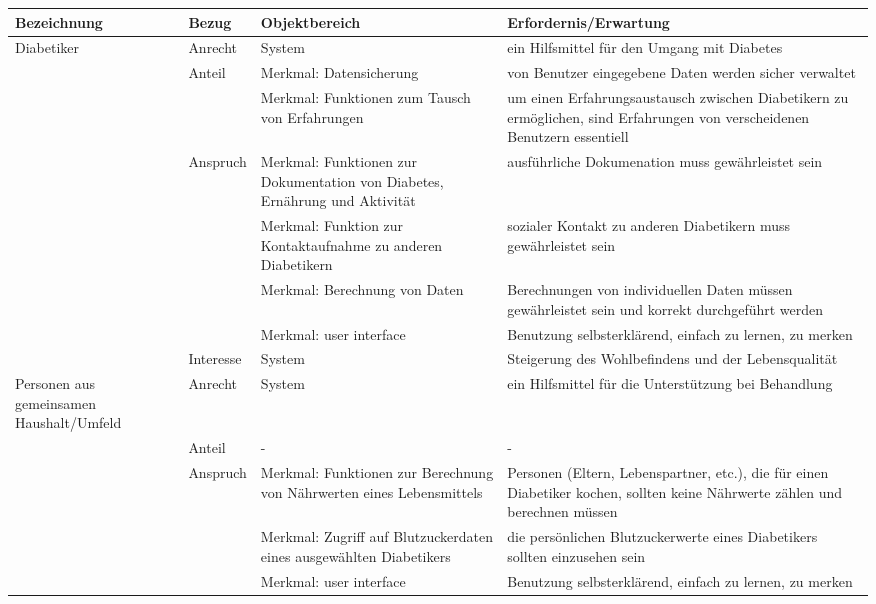 	\begin{center}
		\begin{longtable}[H]{|p{3cm}|p{2cm}|p{4cm}|p{4.5cm}|}
			\hline
			\textbf{Bezeichnung} & \textbf{Bezug} & \textbf{Objektbereich} & \textbf{Erfordernis/Erwartung}\\
			\hline
			Diabetiker & Anrecht & System & ein Hilfsmittel für den Umgang mit Diabetes\\
			\cline{2-4}
			& Anteil & Merkmal: Datensicherung & von Benutzer eingegebene Daten werden sicher verwaltet\\
			\cline{3-4}
			& & Merkmal: Funktionen zum Tausch von Erfahrungen & um einen Erfahrungsaustausch zwischen Diabetikern zu ermöglichen, sind Erfahrungen von verscheidenen Benutzern essentiell\\
			\cline{2-4}
			& Anspruch & Merkmal: Funktionen zur Dokumentation von Diabetes, Ernährung und Aktivität & ausführliche Dokumenation muss gewährleistet sein\\
			\cline{3-4}
			& & Merkmal: Funktion zur Kontaktaufnahme zu anderen Diabetikern & sozialer Kontakt zu anderen Diabetikern muss gewährleistet sein\\
			\cline{3-4}
			& & Merkmal: Berechnung von Daten & Berechnungen von individuellen Daten müssen gewährleistet sein und korrekt durchgeführt werden\\
			\cline{3-4}
			\newpage
			\cline{3-4}
			& & Merkmal: user interface & Benutzung selbsterklärend, einfach zu lernen, zu merken\\
			\cline{2-4}
			& Interesse & System & Steigerung des Wohlbefindens und der Lebensqualität\\
			\hline
			Personen aus gemeinsamen Haushalt/Umfeld & Anrecht & System & ein Hilfsmittel für die Unterstützung bei Behandlung\\
			\cline{2-4}
			& Anteil & - & - \\
			\cline{2-4}
			& Anspruch & Merkmal: Funktionen zur Berechnung von Nährwerten eines Lebensmittels & Personen (Eltern, Lebenspartner, etc.), die für einen Diabetiker kochen, sollten keine Nährwerte zählen und berechnen müssen\\
			\cline{3-4}
			& & Merkmal: Zugriff auf Blutzuckerdaten eines ausgewählten Diabetikers & die persönlichen Blutzuckerwerte eines Diabetikers sollten einzusehen sein\\
			\cline{3-4}
			& & Merkmal: user interface & Benutzung selbsterklärend, einfach zu lernen, zu merken\\
			\cline{2-4}

\end{longtable}
\end{center}
